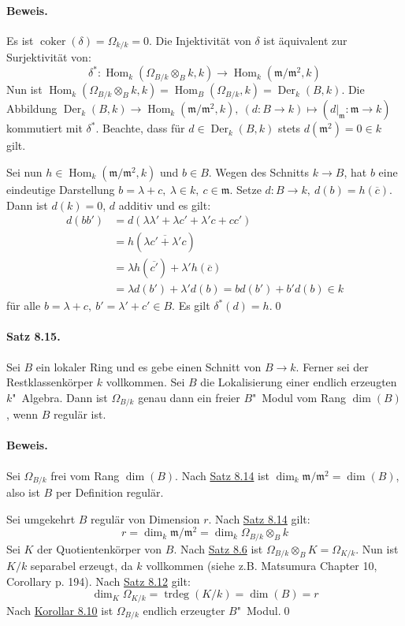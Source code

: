 \paragraph{Beweis.} Es ist $\operatorname{coker}(\delta)=\Omega_{k/k}=0$. Die Injektivität von $\delta$ ist äquivalent zur Surjektivität von:
\[\delta^\ast :\operatorname{Hom}_k(\Omega_{B/k}\otimes_B k,k)\to\operatorname{Hom}_k(\mathfrak{m}/\mathfrak{m}^2,k) \]
Nun ist $\operatorname{Hom}_k(\Omega_{B/k}\otimes_B k,k) = \operatorname{Hom}_B(\Omega_{B/k},k)=\operatorname{Der}_k(B,k)$. Die Abbildung $\operatorname{Der}_k(B,k)\to\operatorname{Hom}_k(\mathfrak{m}/\mathfrak{m}^2,k),\ (d:B\to k)\mapsto (d|_\mathfrak{m}:\mathfrak{m}\to k)$ kommutiert mit $\delta^\ast$. Beachte, dass für $d\in\operatorname{Der}_k(B,k)$ stets $d(\mathfrak{m}^2)=0\in k$ gilt.

Sei nun $h\in\operatorname{Hom}_k(\mathfrak{m}/\mathfrak{m}^2,k)$ und $b\in B$. Wegen des Schnitts $k\to B$, hat $b$ eine eindeutige Darstellung $b=\lambda+c,\ \lambda\in k,\ c\in\mathfrak{m}$. Setze $d:B\to k,\ d(b) =h(\overline{c})$. Dann ist $d(k)=0$, $d$ additiv und es gilt:
\begin{align*}
d(bb') &= d(\lambda\lambda'+\lambda c'+\lambda' c+cc')\\
&= h(\overline{\lambda c'+\lambda' c})\\
&= \lambda h(\overline{c'}) + \lambda' h(\overline{c})\\
&= \lambda d(b')+\lambda' d(b)= bd(b')+b'd(b)\in k
\end{align*}
für alle $b=\lambda+c,\ b'=\lambda'+c'\in B$. Es gilt $\delta^\ast (d)=h$.\qed

\paragraph{Satz 8.15.}\label{8.15} Sei $B$ ein lokaler Ring und es gebe einen Schnitt von $B\to k$. Ferner sei der Restklassenkörper $k$ vollkommen. Sei $B$ die Lokalisierung einer endlich erzeugten $k$"~Algebra. Dann ist $\Omega_{B/k}$ genau dann ein freier $B$"~Modul vom Rang $\dim(B)$, wenn $B$ regulär ist.

\paragraph{Beweis.} Sei $\Omega_{B/k}$ frei vom Rang $\dim(B)$. Nach \hyperref[8.14]{Satz 8.14} ist $\dim_k\mathfrak{m}/\mathfrak{m}^2=\dim(B)$, also ist $B$ per Definition regulär.

Sei umgekehrt $B$ regulär von Dimension $r$. Nach \hyperref[8.14]{Satz 8.14} gilt:
\[r =\dim_k\mathfrak{m}/\mathfrak{m}^2=\dim_k\Omega_{B/k}\otimes_B k \]
Sei $K$ der Quotientenkörper von $B$. Nach \hyperref[8.6]{Satz 8.6} ist $\Omega_{B/k}\otimes_B K=\Omega_{K/k}$. Nun ist $K/k$ separabel erzeugt, da $k$ vollkommen (siehe z.B. Matsumura Chapter 10, Corollary p. 194). Nach \hyperref[8.12]{Satz 8.12} gilt:
\[\dim_K\Omega_{K/k}=\operatorname{trdeg}(K/k)=\dim(B) = r \]
Nach \hyperref[8.10]{Korollar 8.10} ist $\Omega_{B/k}$ endlich erzeugter $B$"~Modul.\qed

